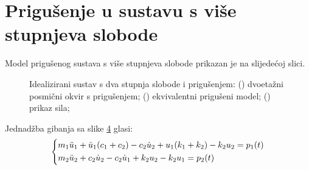 \section{Prigušenje u sustavu s više stupnjeva slobode}
Model prigušenog sustava s više stupnjeva slobode prikazan je na slijedećoj slici.
\par
\begin{figure}[H]
    \begin{subfigure}[b]{0.5\textwidth}
        \centering
        
        \caption{}
        \label{fig:priguseni_sustav_okvir-2dof}
    \end{subfigure}
    \hfill
    \begin{subfigure}[b]{0.5\textwidth}
        \centering
        
        \caption{}
        \label{fig:priguseni_ekvivalentni_sustav-2dof}
    \end{subfigure}
    \vfill
    \vspace{0.5cm}
    \begin{subfigure}[b]{1\textwidth}
        \centering
        
        \caption{}
        \label{fig:priguseni_sustav_okvir_sile-2dof}
    \end{subfigure}
    \caption{Idealizirani sustav s dva stupnja slobode i prigušenjem:
    () dvoetažni posmični okvir s prigušenjem;
    () ekvivalentni prigušeni model;
    () prikaz sila; } 
    \label{fig:priguseni_sustav-2dof}
\end{figure}

Jednadžba gibanja sa slike \ref{fig:priguseni_sustav-2dof} glasi:
\begin{equation}\label{eq:JednadzbaGibanjaPriguseniMDF}
    \begin{dcases}
        m_1\ddot{u}_1+\dot{u}_1(c_1+c_2)-c_2\dot{u}_2+u_1(k_1+k_2)-k_2u_2=p_1(t)\\
        m_2\ddot{u}_2+c_2\dot{u}_2-c_2\dot{u}_1+k_2u_2-k_2u_1=p_2(t)
    \end{dcases}
\end{equation}


